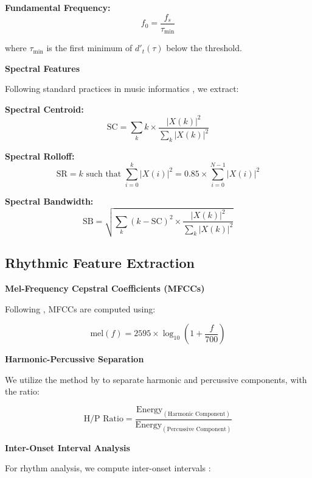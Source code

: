 \documentclass[12pt,a4paper]{article}
\begin{document}
\textbf{Fundamental Frequency:}
\begin{equation}
f_0 = \frac{f_s}{\tau_{\min}}
\end{equation}

where $\tau_{\min}$ is the first minimum of $d'_t(\tau)$ below the threshold.

\textbf{Spectral Features}

Following standard practices in music informatics \citep{tzanetakis2002musical}, we extract:

\textbf{Spectral Centroid:}
\begin{equation}
\text{SC} = \sum_k k \times \frac{|X(k)|^2}{\sum_k |X(k)|^2}
\end{equation}

\textbf{Spectral Rolloff:}
\begin{equation}
\text{SR} = k \text{ such that } \sum_{i=0}^k |X(i)|^2 = 0.85 \times \sum_{i=0}^{N-1} |X(i)|^2
\end{equation}

\textbf{Spectral Bandwidth:}
\begin{equation}
\text{SB} = \sqrt{\sum_k (k - \text{SC})^2 \times \frac{|X(k)|^2}{\sum_k |X(k)|^2}}
\end{equation}

\subsection{Rhythmic Feature Extraction}

\textbf{Mel-Frequency Cepstral Coefficients (MFCCs)}

Following \citet{logan2000mel}, MFCCs are computed using:

\begin{equation}
\text{mel}(f) = 2595 \times \log_{10}\left(1 + \frac{f}{700}\right)
\end{equation}

\textbf{Harmonic-Percussive Separation}

We utilize the method by \citet{fitzgerald2010harmonic} to separate harmonic and percussive components, with the ratio:

\begin{equation}
\text{H/P Ratio} = \frac{\text{Energy}_{(\text{Harmonic Component})}}{\text{Energy}_{(\text{Percussive Component})}}
\end{equation}

\textbf{Inter-Onset Interval Analysis}

For rhythm analysis, we compute inter-onset intervals \citep{london2012hearing}:
\end{document}

